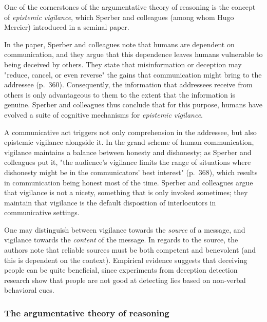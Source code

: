 
One of the cornerstones of the argumentative theory of reasoning is the concept of \emph{epistemic vigilance}, which Sperber and colleagues (among whom Hugo Mercier) introduced in a seminal \citeyear{Sperber10} paper.

In the paper, Sperber and colleagues note that humans are dependent on communication, and they argue that this dependence leaves humans vulnerable to being deceived by others.
They state that misinformation or deception may "reduce, cancel, or even reverse" the gains that communication might bring to the addressee (p.~360).
Consequently, the information that addressees receive from others is only advantageous to them to the extent that the information is genuine.
Sperber and colleagues thus conclude that for this purpose, humans have evolved a suite of cognitive mechanisms for \emph{epistemic vigilance}.

A communicative act triggers not only comprehension in the addressee, but also epistemic vigilance alongside it.
In the grand scheme of human communication, vigilance maintains a balance between honesty and dishonesty; as Sperber and colleagues put it, "the audience's vigilance limits the range of situations where dishonesty might be in the communicators' best interest" (p.~368), which results in communication being honest most of the time.
Sperber and colleagues argue that vigilance is not a nicety, something that is only invoked sometimes; they maintain that vigilance is the default disposition of interlocutors in communicative settings.

One may distinguish between vigilance towards the \emph{source} of a message, and vigilance towards the \emph{content} of the message.
In regards to the source, the authors note that reliable sources must be both competent and benevolent (and this is dependent on the context).
Empirical evidence suggests that deceiving people can be quite beneficial, since experiments from deception detection research show that people are not good at detecting lies based on non-verbal behavioral cues.

\subsubsection{The argumentative theory of reasoning}

